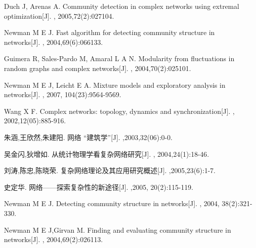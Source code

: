 \documentclass[a4paper,12pt,openany,oneside,utf-8]{ctexbook}
\begin{document}
\begin{spacing}{1.2}
\begin{thebibliography}{1}
{            
            Duch J, Arenas A. 
            \newblock Community detection in complex networks using extremal optimization[J].
            ,{ 2005,72(2):027104}.
            
            Newman M E J.
            \newblock Fast algorithm for detecting community structure in networks[J].
            ,{ 2004,69(6):066133}.
            
           Guimera R, Sales-Pardo M, Amaral L A N.
            \newblock Modularity from fluctuations in random graphs and complex networks[J].
            ,{ 2004,70(2):025101}.
            
            Newman M E J, Leicht E A. 
            \newblock Mixture models and exploratory analysis in networks[J].
            ,{ 2007,
              104(23):9564-9569}.
              
            Wang X F.
            \newblock Complex networks: topology, dynamics and synchronization[J].
            ,{ 2002,12(05):885-916}.
            
            朱涵,王欣然,朱建阳.
            \newblock 网络 “建筑学”[J].
            ,{2003,32(06):0-0}.
            
            吴金闪,狄增如.
            \newblock 从统计物理学看复杂网络研究[J].
            ,{ 2004,24(1):18-46}.
            
            刘涛,陈忠,陈晓荣.
            \newblock 复杂网络理论及其应用研究概述[J].
            ,{2005,23(6):1-7}.
            
            史定华.
            \newblock 网络——探索复杂性的新途径[J].
            ,{2005}, {20(2):115-119}.
            
            Newman M E J.
            \newblock Detecting community structure in networks[J].
            ,{ 2004, 38(2):321-330}.
            
            Newman M E J,Girvan M.
            \newblock Finding and evaluating community structure in networks[J].
            ,{ 2004,69(2):026113}.
            
}
\end{thebibliography}
\end{spacing}
\end{document}
